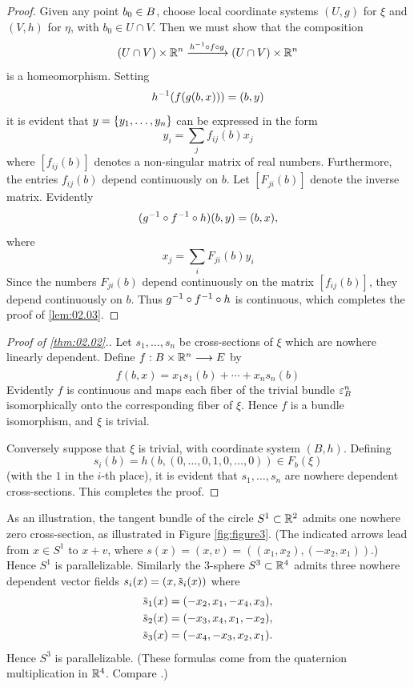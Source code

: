 \documentclass[../main]{subfiles}
\begin{document}
\begin{proof}
Given any point $b_0 \in {B}$, choose local coordinate systems
$(U,g)$ for $\xi$ and $(V,h)$ for $\eta$, with $b_{0} \in U \cap V$. Then we must show that the composition
\[(U \cap V) \times \mathbb{R}^{n} \varrightarrow{h\inv \circ f \circ g}(U \cap V) \times \mathbb{R}^{n}\]
is a homeomorphism. Setting
\[h^{-1}(f(g(b, x))) = (b, y)\]
it is evident that $y = \left\{y_1,\ldots,y_n\right\}$ can be expressed in the form
\[y_{i} = \sum_{j} f_{i j}(b) x_{j}\]
where $[f_{i j}(b)]$ denotes a non-singular matrix of real numbers. 
Furthermore, the entries $f_{i j}(b)$ depend continuously on $b$. Let $[F_{ji}(b)]$ denote
the inverse matrix. Evidently
\[(g^{-1} \circ f^{-1} \circ h)(b, y) = (b, x), \]
where
\[x_{j} = \sum_{i} F_{ji}(b) y_{i}\]
Since the numbers $F_{ji}(b)$ depend continuously on the matrix $[f_{i j}(b)]$,
they depend continuously on $b$. Thus $g^{-1} \circ f^{-1} \circ h$ is continuous, which
completes the proof of \ref{lem:02.03}.
\end{proof}


\begin{proof}[Proof of \ref{thm:02.02}.]
Let $s_1,\ldots,s_n$ be cross-sections of $\xi$ which
are nowhere linearly dependent. Define
$f: {\B} \times \bR^{n} \varrightarrow{} \total$ by
\[f(b, x) = x_{1} s_{1}(b)+\cdots+x_{n} s_{n}(b)\]
Evidently $f$ is continuous and maps each fiber of the trivial bundle $\varepsilon^n_{B}$
isomorphically onto the corresponding fiber of $\xi$. Hence $f$ is a bundle
isomorphism, and $\xi$ is trivial.

Conversely suppose that $\xi$ is trivial, with coordinate system $(B, h)$. Defining
\[s_{i}(b) = h(b,(0, \dots, 0,1,0, \dots, 0)) \in F_{b}(\xi)\]
(with the $1$ in the $i$-th place), it is evident that $s_1,\dots,s_n$ are nowhere
dependent cross-sections. This completes the proof.
\end{proof}


As an illustration, the tangent bundle of the circle $S^{1} \subset \mathbb R^2$ admits
one nowhere zero cross-section, as illustrated in Figure \ref{fig:figure3}. (The indicated
arrows lead from $x\in S^{1}$  to $x + v$, where $s(x) = (x, v) = ((x_1,x_2), (-x_2,x_1))$.)
Hence $S^{1}$  is parallelizable. Similarly the $3$-sphere $S^{3}\subset\mathbb R^4$ admits
three nowhere dependent vector fields $s_{i}(x)=(x, \xoverline{s}_{i}(x))$ where
\begin{align*}
		\xoverline{s}_{1}(x)&=(-x_{2}, x_{1},-x_{4}, x_{3}), \\
		\xoverline{s}_{2}(x)&=(-x_{3}, x_{4}, x_{1},-x_{2}), \\
		\xoverline{s}_{3}(x)&=(-x_{4},-x_{3}, x_{2}, x_{1}).
\end{align*}
Hence $S^{3}$ is parallelizable. (These formulas come from the quaternion multiplication in $\mathbb R^4$. Compare \cite{steenrodwhitehead1951}.)
\end{document}
